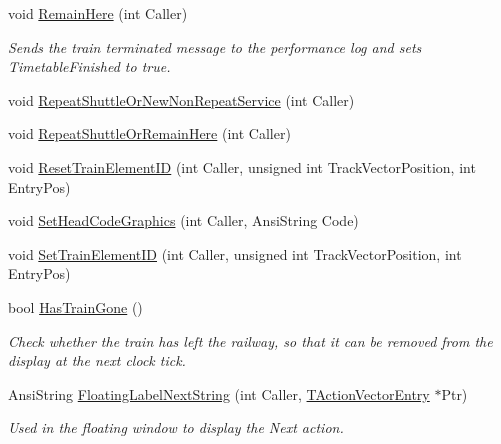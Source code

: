 \begin{DoxyCompactItemize}
\mbox{\label{class_t_train_abd68a68b5ce295ee01171615f3d2c7ec}} 
void \mbox{\hyperlink{class_t_train_abd68a68b5ce295ee01171615f3d2c7ec}{Remain\+Here}} (int Caller)
\begin{DoxyCompactList}\small\item\em Sends the \textquotesingle{}train terminated\textquotesingle{} message to the performance log and sets Timetable\+Finished to true. \end{DoxyCompactList}\item 
void \mbox{\hyperlink{class_t_train_a8262f447ec811db7e524c7bb885226c5}{Repeat\+Shuttle\+Or\+New\+Non\+Repeat\+Service}} (int Caller)
\item 
void \mbox{\hyperlink{class_t_train_ac6f5cda912103fda4da31bdca611e4b5}{Repeat\+Shuttle\+Or\+Remain\+Here}} (int Caller)
\item 
void \mbox{\hyperlink{class_t_train_ace302d98b5685104d294869b161e20a0}{Reset\+Train\+Element\+ID}} (int Caller, unsigned int Track\+Vector\+Position, int Entry\+Pos)
\item 
void \mbox{\hyperlink{class_t_train_a594228489e522dfde0ffbe124cd27103}{Set\+Head\+Code\+Graphics}} (int Caller, Ansi\+String Code)
\item 
void \mbox{\hyperlink{class_t_train_a0e0ab54415645b04cbdeadd829d27898}{Set\+Train\+Element\+ID}} (int Caller, unsigned int Track\+Vector\+Position, int Entry\+Pos)
\item 
\mbox{\label{class_t_train_af95a34f2334cb991841c24997d445ae3}} 
bool \mbox{\hyperlink{class_t_train_af95a34f2334cb991841c24997d445ae3}{Has\+Train\+Gone}} ()
\begin{DoxyCompactList}\small\item\em Check whether the train has left the railway, so that it can be removed from the display at the next clock tick. \end{DoxyCompactList}\item 
\mbox{\label{class_t_train_a221da69cd80d206a06f840f4cd463cf9}} 
Ansi\+String \mbox{\hyperlink{class_t_train_a221da69cd80d206a06f840f4cd463cf9}{Floating\+Label\+Next\+String}} (int Caller, \mbox{\hyperlink{class_t_action_vector_entry}{T\+Action\+Vector\+Entry}} $\ast$Ptr)
\begin{DoxyCompactList}\small\item\em Used in the floating window to display the \textquotesingle{}Next\textquotesingle{} action. \end{DoxyCompactList}\item 

\end{DoxyCompactItemize}

